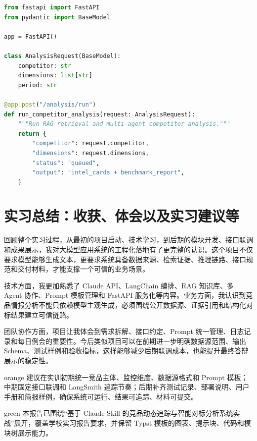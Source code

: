 \documentclass[UTF8,zihao=-4,a4paper]{ctexart}
\begin{document}
\begin{lstlisting}[style=reportcode,language=Python,caption={竞品分析接口示例}]
from fastapi import FastAPI
from pydantic import BaseModel

app = FastAPI()

class AnalysisRequest(BaseModel):
    competitor: str
    dimensions: list[str]
    period: str

@app.post("/analysis/run")
def run_competitor_analysis(request: AnalysisRequest):
    """Run RAG retrieval and multi-agent competitor analysis."""
    return {
        "competitor": request.competitor,
        "dimensions": request.dimensions,
        "status": "queued",
        "output": "intel_cards + benchmark_report",
    }
\end{lstlisting}

\section{实习总结：收获、体会以及实习建议等}

回顾整个实习过程，从最初的项目启动、技术学习，到后期的模块开发、接口联调和成果展示，我对大模型应用系统的工程化落地有了更完整的认识。这个项目不仅要求模型能够生成文本，更要求系统具备数据来源、检索证据、推理链路、接口规范和交付材料，才能支撑一个可信的业务场景。

技术方面，我更加熟悉了 Claude API、LangChain 编排、RAG 知识库、多 Agent 协作、Prompt 模板管理和 FastAPI 服务化等内容。业务方面，我认识到竞品情报分析不能只依赖模型主观生成，必须围绕公开数据源、证据引用和结构化对标结果建立可信链路。

团队协作方面，项目让我体会到需求拆解、接口约定、Prompt 统一管理、日志记录和每日例会的重要性。今后类似项目可以在前期进一步明确数据源范围、输出 Schema、测试样例和验收指标，这样能够减少后期联调成本，也能提升最终答辩展示的稳定性。

\begin{reportbox}[后续建议]{orange}
建议在实训初期统一竞品主体、监控维度、数据源格式和 Prompt 模板；中期固定接口联调和 LangSmith 追踪节奏；后期补齐测试记录、部署说明、用户手册和简报样例，确保系统可运行、结果可追踪、材料可提交。
\end{reportbox}

\begin{reportbox}[总结]{green}
本报告已围绕“基于 Claude Skill 的竞品动态追踪与智能对标分析系统实战”展开，覆盖学校实习报告要求，并保留 Typst 模板的图表、提示块、代码和模块树展示能力。
\end{reportbox}
\end{document}
